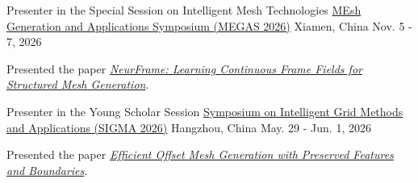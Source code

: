 

\begin{cventries}

  \cventry
    {Presenter in the Special Session on Intelligent Mesh Technologies} %
    {\href{https://graphics.xmu.edu.cn/MEGAS2026/index.html}{MEsh Generation and Applications Symposium (MEGAS 2026)}} %
    {Xiamen, China} %
    {Nov. 5 - 7, 2026} %
    {
      \begin{cvitems} %
        \item {Presented the paper \emph{\href{https://arxiv.org/abs/2603.12820}{NeurFrame: Learning Continuous Frame Fields for Structured Mesh Generation}}.}
      \end{cvitems}
    }

  \cventry
    {Presenter in the Young Scholar Session} %
    {\href{https://mp.weixin.qq.com/s/rh_EoJRCUe0eg0RSsuWNpw}{Symposium on Intelligent Grid Methods and Applications (SIGMA 2026)}} %
    {Hangzhou, China} %
    {May. 29 - Jun. 1, 2026} %
    {
      \begin{cvitems} %
        \item {Presented the paper \emph{\href{https://dl.acm.org/doi/10.1145/3832781}{Efficient Offset Mesh Generation with Preserved Features and Boundaries}}.}
      \end{cvitems}
    }
\end{cventries}
